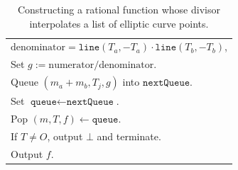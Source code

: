 \documentclass[11pt,letterpaper]{article}
\theoremstyle{definition}
\newcommand{\6}{\mathbf}
\newcommand{\7}{\mathcal}
\begin{document}
\begin{table}[H]
\begin{tabular}{|l|}
    \quad\quad\quad $\text{denominator} = \texttt{line}(T_{a}, -T_{a}) \cdot \texttt{line}(T_{b}, -T_{b})$,\\
    \quad\quad Set $g := \text{numerator}/\text{denominator}$.\\
    \quad\quad Queue $(m_a+m_b, T_{j}, g)$ into $\texttt{nextQueue}$. \\
    \quad Set $\texttt{queue} \leftarrow \texttt{nextQueue}$. \\
    Pop $(m, T, f) \leftarrow \texttt{queue}$. \\
    If $T \neq O$, output $\bot$ and terminate. \\
    Output $f$. \\
    \hline
    \end{tabular}    
    \caption{Constructing a rational function whose divisor interpolates a list of elliptic curve points.}
    \label{alg:makewitness}
\end{table}
\end{document}
